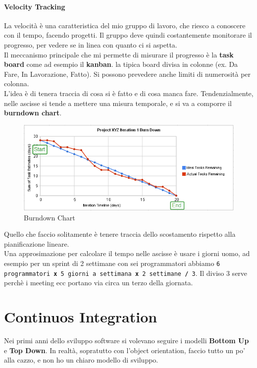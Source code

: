 \documentclass[a4paper,12pt]{article}
\begin{document}
\paragraph{Velocity Tracking}
La velocità è una caratteristica del mio gruppo di lavoro, che riesco a conoscere con il tempo, facendo progetti. Il gruppo deve quindi costantemente monitorare il progresso, per vedere se in linea con quanto ci si aspetta.\\
Il meccanismo principale che mi permette di misurare il progresso è la \textbf{task board} come ad esempio il \textbf{kanban}. \E la tipica board divisa in colonne (ex. Da Fare, In Lavorazione, Fatto). Si possono prevedere anche limiti di numerosità per colonna.\\
L'idea è di tenera traccia di cosa si è fatto e di cosa manca fare. Tendenzialmente, nelle ascisse si tende a mettere una misura temporale, e si va a comporre il \textbf{burndown chart}.
\begin{figure}[H]
	\centering
	 \includegraphics[width=\linewidth]{Immagini/burnDown}
	 \caption{Burndown Chart}
\end{figure}
Quello che faccio solitamente è tenere traccia dello scostamento rispetto alla pianificazione lineare.\\
Una approsimazione per calcolare il tempo nelle ascisse è usare i giorni uomo, ad esempio per un sprint di 2 settimane con sei programmatori abbiamo \texttt{6 programmatori \textbf{x} 5 giorni a settimana \textbf{x} 2 settimane \textbf{/} 3}. Il diviso 3 serve perchè i meeting ecc portano via circa un terzo della giornata.

\section{Continuos Integration}
Nei primi anni dello sviluppo software si volevano seguire i modelli \textbf{Bottom Up} e \textbf{Top Down}. In realtà, sopratutto con l'object orientation, faccio tutto un po' alla cazzo, e non ho un chiaro modello di sviluppo.
\end{document}
